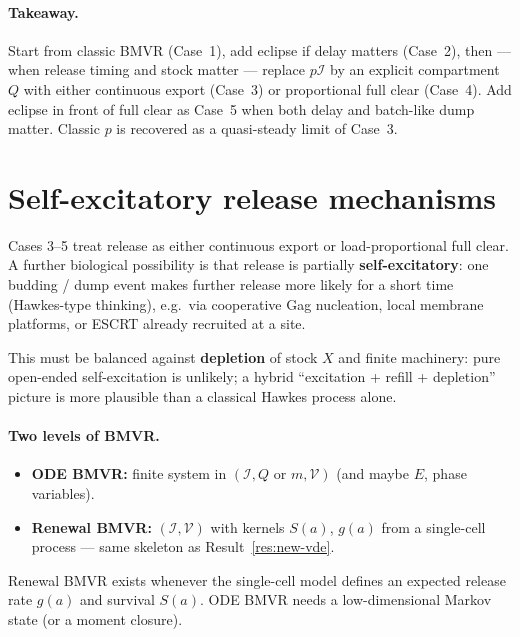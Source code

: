 \documentclass[11pt,a4paper]{article}
\newcommand{\Icell}{\mathcal{I}}
\newcommand{\Vfree}{\mathcal{V}}
\theoremstyle{plain}
\theoremstyle{definition}
\theoremstyle{remark}
\begin{document}
\paragraph{Takeaway.}
Start from classic BMVR (Case~1), add eclipse if delay matters (Case~2), then
--- when release timing and stock matter --- replace $p\Icell$ by an explicit
compartment $Q$ with either continuous export (Case~3) or proportional full
clear (Case~4). Add eclipse in front of full clear as Case~5 when both delay
and batch-like dump matter. Classic $p$ is recovered as a quasi-steady limit of
Case~3.

\section{Self-excitatory release mechanisms}
\label{sec:self-excite}

Cases 3--5 treat release as either continuous export or load-proportional full
clear. A further biological possibility is that release is partially
\textbf{self-excitatory}: one budding / dump event makes further release more
likely for a short time (Hawkes-type thinking), e.g.\ via cooperative Gag
nucleation, local membrane platforms, or ESCRT already recruited at a site.

This must be balanced against \textbf{depletion} of stock $X$ and finite
machinery: pure open-ended self-excitation is unlikely; a hybrid
``excitation + refill + depletion'' picture is more plausible than a classical
Hawkes process alone.

\paragraph{Two levels of BMVR.}
\begin{itemize}
\item \textbf{ODE BMVR:} finite system in
$(\Icell,Q\text{ or }m,\Vfree)$ (and maybe $E$, phase variables).
\item \textbf{Renewal BMVR:} $(\Icell,\Vfree)$ with kernels $S(a)$, $g(a)$ from
a single-cell process --- same skeleton as Result~\ref{res:new-vde}.
\end{itemize}
Renewal BMVR exists whenever the single-cell model defines an expected release
rate $g(a)$ and survival $S(a)$. ODE BMVR needs a low-dimensional Markov
state (or a moment closure).
\end{document}
